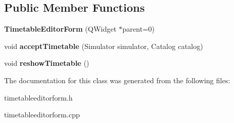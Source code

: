 \subsection*{Public Member Functions}
\begin{DoxyCompactItemize}
\item 
{\bfseries Timetable\+Editor\+Form} (Q\+Widget $\ast$parent=0)\hypertarget{class_timetable_editor_form_ac71380513c6d189dee464071970ff304}{}\label{class_timetable_editor_form_ac71380513c6d189dee464071970ff304}

\item 
void {\bfseries accept\+Timetable} (Simulator simulator, Catalog catalog)\hypertarget{class_timetable_editor_form_aa61d64a28d26bf2f3651f014abf83438}{}\label{class_timetable_editor_form_aa61d64a28d26bf2f3651f014abf83438}

\item 
void {\bfseries reshow\+Timetable} ()\hypertarget{class_timetable_editor_form_a813efeb779a096d26295dc143af4e899}{}\label{class_timetable_editor_form_a813efeb779a096d26295dc143af4e899}

\end{DoxyCompactItemize}


The documentation for this class was generated from the following files\+:\begin{DoxyCompactItemize}
\item 
timetableeditorform.\+h\item 
timetableeditorform.\+cpp\end{DoxyCompactItemize}
